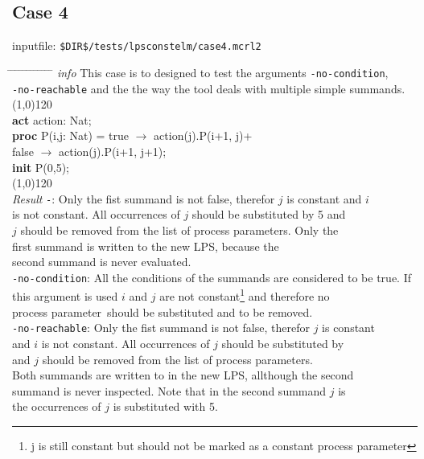 \index{}\documentclass[a4paper,10pt]{article}
\theoremstyle{plain}
\theoremstyle{definition}
\newcommand{\pp}{process parameter}
\newcommand{\pps}{process parameters}
\newcommand{\ti}{\textit}
\newcommand{\tb}{\textbf}
\newcommand{\tabw}{\hspace*{15.mm} \= \hspace*{20.mm} \= \hspace*{5.mm} \= \hspace*{5.mm} \= \hspace*{5.mm} \= \hspace*{5.mm}  \= \hspace*{5.mm}  \= \hspace*{5.mm}  \= \hspace*{5.mm} \= \hspace*{5.mm} \= \hspace*{5.mm}  \= \hspace*{5.mm}  \= \hspace*{5.mm}\kill}
\begin{document}
\subsection*{Case 4}
inputfile: \verb"$DIR$/tests/lpsconstelm/case4.mcrl2"
\begin{tabbing}
\tabw
\ti{info} \> This case is to designed to test the arguments \verb"-no-condition", \\
\> \verb"-no-reachable" and the the way the tool deals with multiple simple summands. \\
\line(1,0){120}\\
\tb{act}  \> action: Nat;\\
\tb{proc} \> P(i,j: Nat) \> = \> true  $\rightarrow$ action(j).P(i+1, j)+\\
          \>             \>   \> false $\rightarrow$ action(j).P(i+1, j+1);\\
\tb{init} \> P(0,5);\\
\line(1,0){120}\\
\ti{Result} 
\> \verb"-": \> \> Only the fist summand is not false, therefor $j$ is constant and $i$ \\
\> \> \> is not constant. All occurrences of $j$ should be substituted by 5 and \\
\> \> \> $j$ should be removed from the list of \pps. Only the \\
\> \> \> first summand is written to the new LPS, because the \\
\> \> \> second summand is never evaluated.\\
\> \verb"-no-condition": \> \> All the conditions of the summands are considered to be true. If \\
\> \> \> this argument is used $i$ and $j$ are not constant\footnote{j is still constant but should not be marked as a constant \pp } and therefore no \\
\> \> \> \pp\ should be substituted and to be removed.\\
\> \verb"-no-reachable": \> \> Only the fist summand is not false, therefor $j$ is constant \\
\> \> \> and $i$ is not constant. All occurrences of $j$ should be substituted by \\
\> \>  and $j$ should be removed from the list of \pps. \\
\> \> \> Both summands are written to in the new LPS, allthough the second \\
\> \> \> summand is never inspected. Note that in the second summand $j$ is \\
\> \> \> the occurrences of $j$ is substituted with 5.\\
\end{tabbing}
\end{document}
